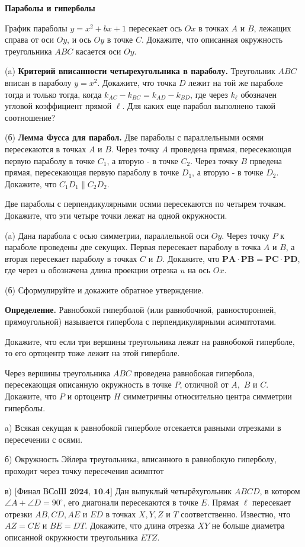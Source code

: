 \centerline{\bf \Huge Параболы и гиперболы}

График параболы $y=x^2+b x+1$ пересекает ось $O x$ в точках $A$ и $B$, лежащих справа от оси $O y$, и ось $O y$ в точке $C$. Докажите, что описанная окружность треугольника $A B C$ касается оси $O y$.

(a) \textbf{Критерий вписанности четырехугольника в параболу.} Треугольник $A B C$ вписан в параболу $y=x^2$. Докажите, что точка $D$ лежит на той же параболе тогда и только тогда, когда $k_{A C}-k_{B C}=k_{A D}-k_{B D}$, где через $k_{\ell}$ обозначен угловой коэффициент прямой $\ell$. Для каких еще парабол выполнено такой соотношение?

\noindent
(б) \textbf{Лемма Фусса для парабол.} Две параболы с параллельными осями пересекаются в точках $A$ и $B$. Через точку $A$ проведена прямая, пересекающая первую параболу в точке $C_1$, а вторую - в точке $C_2$. Через точку $B$ прведена прямая, пересекающая первую параболу в точке $D_1$, а вторую - в точке $D_2$. Докажите, что $C_1 D_1 \| C_2 D_2$.

Две параболы с перпендикулярными осями пересекаются по четырем точкам. Докажите, что эти четыре точки лежат на одной окружности.

(a) Дана парабола с осью симметрии, параллельной оси $O y$. Через точку $P$ к параболе проведены две секущих. Первая пересекает параболу в точка $A$ и $B$, а вторая пересекает параболу в точках $C$ и $D$. Докажите, что $\mathbf{P A} \cdot \mathbf{P B} =\mathbf{P C} \cdot \mathbf{P D}$, где через $\mathbf{u}$ обозначена длина проекции отрезка $u$ на ось $O x$.

\noindent
(б) Сформулируйте и докажите обратное утверждение.

\textbf{Определение.} Равнобокой гиперболой (или равнобочной, равносторонней, прямоугольной) называется гипербола с перпендикулярными асимптотами.

Докажите, что если три вершины треугольника лежат на равнобокой гиперболе, то его ортоцентр тоже лежит на этой гиперболе.

Через вершины треугольника $ABC$ проведена равнобокая гипербола, пересекающая описанную окружность в точке $P$, отличной от $A,$ $B$ и $C$. Докажите, что $P$ и ортоцентр $H$ симметричны относительно центра симметрии гиперболы.


\newpage

\hspace{3mm}

a) Всякая секущая к равнобокой гиперболе отсекается равными отрезками в пересечении с осями.

\noindent
б) Окружность Эйлера треугольника, вписанного в равнобокую гиперболу, проходит через точку пересечения асимптот

\noindent
в) $\bigl[\textbf{Финал ВСоШ 2024, 10.4}\bigr]$
Дан выпуклый четырёхугольник $A B C D$, в котором $\angle A+\angle D= 90^{\circ}$, его диагонали пересекаются в точке $E$. Прямая $\ell$ пересекает отрезки $A B, C D, A E$ и $E D$ в точках $X, Y, Z$ и $T$ соответственно. Известно, что $A Z=C E$ и $B E=D T$. Докажите, что длина отрезка $X Y$ не больше диаметра описанной окружности треугольника $E T Z$.